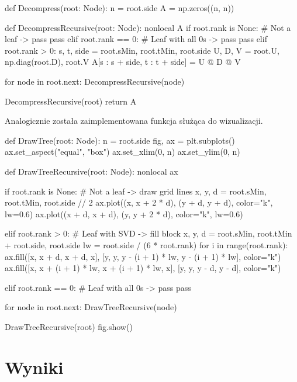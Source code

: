 \documentclass{../myclass}
\begin{document}
\begin{python}
def Decompress(root: Node):
    n = root.side
    A = np.zeros((n, n))

    def DecompressRecursive(root: Node):
        nonlocal A
        if root.rank is None:  # Not a leaf -> pass
            pass
        elif root.rank == 0:  # Leaf with all 0s -> pass
            pass
        elif root.rank > 0:
            s, t, side = root.sMin, root.tMin, root.side
            U, D, V = root.U, np.diag(root.D), root.V
            A[s : s + side, t : t + side] = U @ D @ V

        for node in root.next:
            DecompressRecursive(node)

    DecompressRecursive(root)
    return A
\end{python}
\newpage
Analogicznie została zaimplementowana funkcja służąca do wizualizacji.
\begin{python}
def DrawTree(root: Node):
    n = root.side
    fig, ax = plt.subplots()
    ax.set_aspect("equal", "box")
    ax.set_xlim(0, n)
    ax.set_ylim(0, n)

    def DrawTreeRecursive(root: Node):
        nonlocal ax

        if root.rank is None:  # Not a leaf -> draw grid lines
            x, y, d = root.sMin, root.tMin, root.side // 2
            ax.plot((x, x + 2 * d), (y + d, y + d), color="k", lw=0.6)
            ax.plot((x + d, x + d), (y, y + 2 * d), color="k", lw=0.6)

        elif root.rank > 0:  # Leaf with SVD -> fill block
            x, y, d = root.sMin, root.tMin + root.side, root.side
            lw = root.side / (6 * root.rank)
            for i in range(root.rank):
                ax.fill([x, x + d, x + d, x], 
                        [y, y, y - (i + 1) * lw, y - (i + 1) * lw], 
                        color="k")
                ax.fill([x, x + (i + 1) * lw, x + (i + 1) * lw, x], 
                        [y, y, y - d, y - d], 
                        color="k")

        elif root.rank == 0:  # Leaf with all 0s -> pass
            pass

        for node in root.next:
            DrawTreeRecursive(node)

    DrawTreeRecursive(root)
    fig.show()
\end{python}
\newpage

\section{Wyniki}
\end{document}
